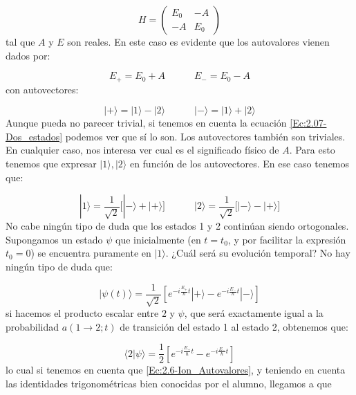 \documentclass[12pt,a4paper]{book}
\numberwithin{equation}{chapter}
\numberwithin{figure}{chapter}
\newcommand{\tquad}{\quad \quad \quad}
\newcommand{\ccorchetes}[1]{\left[ #1  \right]}
\begin{document}
\begin{equation}
H = \begin{pmatrix}
E_0 & -A \\
-A & E_0
\end{pmatrix}
\end{equation}
tal que $A$ y $E$ son reales. En este caso es evidente que los autovalores vienen dados por:

\begin{equation}
E_+ = E_0 + A  \tquad E_- = E_0 - A
\end{equation}
con autovectores:

\begin{equation}
|+\rangle = |1 \rangle - | 2 \rangle \tquad |-\rangle = | 1 \rangle + | 2 \rangle \label{Ec:2.6-Ion_Autovalores}
\end{equation}
Aunque pueda no parecer trivial, si tenemos en cuenta la ecuación \ref{Ec:2.07-Dos_estados} podemos ver que sí lo son. Los autovectores también son triviales. En cualquier caso, nos interesa ver cual es el significado físico de $A$. Para esto tenemos que expresar $|1\rangle,|2\rangle $ en función de los autovectores. En ese caso tenemos que:

\begin{equation}
|1 \rangle = \frac{1}{\sqrt{2}} \Big[    | - \rangle + |+\rangle  \Big] \tquad 
|2 \rangle = \frac{1}{\sqrt{2}} \Big[  | - \rangle - |+ \rangle \Big]
\end{equation}
No cabe ningún tipo de duda que los estados 1 y 2 continúan siendo ortogonales. Supongamos un estado $\psi$ que inicialmente (en $t=t_0$, y por facilitar la expresión $t_0=0$) se encuentra puramente en $|1\rangle$. ¿Cuál será su evolución temporal? No hay ningún tipo de duda que:

\begin{equation}
|\psi (t) \rangle = \frac{1}{\sqrt{2}} \ccorchetes{ e^{-i \frac{E_{+}}{\hbar} t } | + \rangle  -  e^{-i \frac{E_{-}}{\hbar} t } | - \rangle  } 
\end{equation} 
si hacemos el producto escalar entre $2$ y $\psi$, que será exactamente igual a la probabilidad $a(1 \rightarrow 2;t)$ de transición del estado 1 al estado 2, obtenemos que:

\begin{equation}
\langle 2 | \psi \rangle = \dfrac{1}{2} \ccorchetes{ e^{- i  \frac{E_+}{\hbar} t } - e^{- i \frac{E_-}{\hbar} t } }
\end{equation}
lo cual si tenemos en cuenta que \ref{Ec:2.6-Ion_Autovalores}, y teniendo en cuenta las identidades trigonométricas bien conocidas por el alumno, llegamos a que
\end{document}
